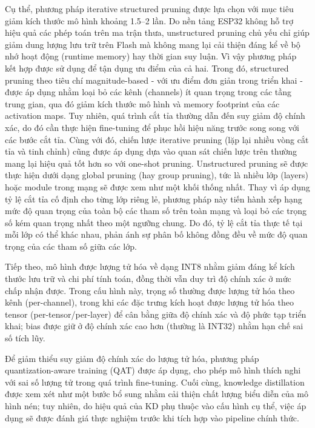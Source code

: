 Cụ thể, phương pháp iterative structured pruning được lựa chọn với mục tiêu giảm kích thước mô hình khoảng 1.5–2 lần. Do nền tảng ESP32 không hỗ trợ hiệu quả các phép toán trên ma trận thưa, unstructured pruning chủ yếu chỉ giúp giảm dung lượng lưu trữ trên Flash mà không mang lại cải thiện đáng kể về bộ nhớ hoạt động (runtime memory) hay thời gian suy luận. Vì vậy phương pháp kết hợp được sử dụng để tận dụng ưu điểm của cả hai. Trong đó, structured pruning theo tiêu chí magnitude-based - với ưu điểm đơn giản trong triển khai - được áp dụng nhằm loại bỏ các kênh (channels) ít quan trọng trong các tầng trung gian, qua đó giảm kích thước mô hình và memory footprint của các activation maps. Tuy nhiên, quá trình cắt tỉa thường dẫn đến suy giảm độ chính xác, do đó cần thực hiện fine-tuning để phục hồi hiệu năng trước song song với các bước cắt tỉa. Cùng với đó, chiến lược iterative pruning (lặp lại nhiều vòng cắt tỉa và tinh chỉnh) cũng được áp dụng dựa vào quan sát chiến lược trên thường mang lại hiệu quả tốt hơn so với one-shot pruning. Unstructured pruning sẽ được thực hiện dưới dạng global pruning (hay group pruning), tức là nhiều lớp (layers) hoặc module trong mạng sẽ được xem như một khối thống nhất. Thay vì áp dụng tỷ lệ cắt tỉa cố định cho từng lớp riêng lẻ, phương pháp này tiến hành xếp hạng mức độ quan trọng của toàn bộ các tham số trên toàn mạng và loại bỏ các trọng số kém quan trọng nhất theo một ngưỡng chung. Do đó, tỷ lệ cắt tỉa thực tế tại mỗi lớp có thể khác nhau, phản ánh sự phân bố không đồng đều về mức độ quan trọng của các tham số giữa các lớp.\cite{mao_2021_pytorch}

Tiếp theo, mô hình được lượng tử hóa về dạng INT8 nhằm giảm đáng kể kích thước lưu trữ và chi phí tính toán, đồng thời vẫn duy trì độ chính xác ở mức chấp nhận được. Trong cấu hình này, trọng số thường được lượng tử hóa theo kênh (per-channel), trong khi các đặc trưng kích hoạt được lượng tử hóa theo tensor (per-tensor/per-layer) để cân bằng giữa độ chính xác và độ phức tạp triển khai; bias được giữ ở độ chính xác cao hơn (thường là INT32) nhằm hạn chế sai số tích lũy.

Để giảm thiểu suy giảm độ chính xác do lượng tử hóa, phương pháp quantization-aware training (QAT) được áp dụng, cho phép mô hình thích nghi với sai số lượng tử trong quá trình fine-tuning. Cuối cùng, knowledge distillation được xem xét như một bước bổ sung nhằm cải thiện chất lượng biểu diễn của mô hình nén; tuy nhiên, do hiệu quả của KD phụ thuộc vào cấu hình cụ thể, việc áp dụng sẽ được đánh giá thực nghiệm trước khi tích hợp vào pipeline chính thức.

